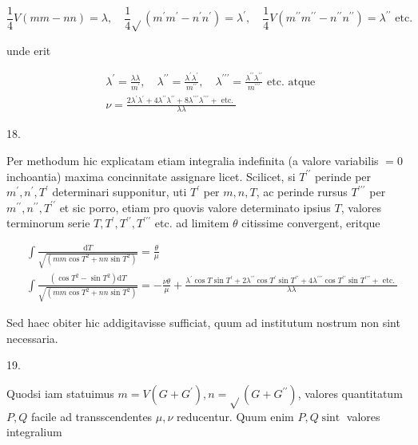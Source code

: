 \documentclass[10pt]{article}
\begin{document}
\[
\frac{1}{4} V(m m-n n)=\lambda, \quad \frac{1}{4} \sqrt{ }\left(m^{\prime} m^{\prime}-n^{\prime} n^{\prime}\right)=\lambda^{\prime}, \quad \frac{1}{4} V\left(m^{\prime \prime} m^{\prime \prime}-n^{\prime \prime} n^{\prime \prime}\right)=\lambda^{\prime \prime} \text { etc. }
\]

unde erit

\[
\begin{aligned}
& \lambda^{\prime}=\frac{\lambda \lambda}{m^{\prime}}, \quad \lambda^{\prime \prime}=\frac{\lambda^{\prime} \lambda^{\prime}}{m^{\prime \prime}}, \quad \lambda^{\prime \prime \prime}=\frac{\lambda^{\prime \prime} \lambda^{\prime \prime}}{m^{\prime \prime \prime}} \text { etc. atque } \\
& \nu=\frac{2 \lambda^{\prime} \lambda^{\prime}+4 \lambda^{\prime \prime} \lambda^{\prime \prime}+8 \lambda^{\prime \prime \prime} \lambda^{\prime \prime \prime}+\text { etc. }}{\lambda \lambda}
\end{aligned}
\]

18.

Per methodum hic explicatam etiam integralia indefinita (a valore variabilis \(=0\) inchoantia) maxima concinnitate assignare licet. Scilicet, si \(T^{\prime \prime}\) perinde per \(m^{\prime}, n^{\prime}, T^{\prime}\) determinari supponitur, uti \(T^{\prime}\) per \(m, n, T\), ac perinde rursus \(T^{\prime \prime \prime}\) per \(m^{\prime \prime}, n^{\prime \prime}, T^{\prime \prime}\) et sic porro, etiam pro quovis valore determinato ipsius \(T\), valores terminorum serie \(T, T^{\prime}, T^{\prime \prime}, T^{\prime \prime \prime}\) etc. ad limitem \(\theta\) citissime convergent, eritque

\[
\begin{aligned}
& \int \frac{\mathrm{d} T}{\sqrt{\left(m m \cos T^{2}+n n \sin T^{2}\right)}}=\frac{\theta}{\mu} \\
& \int \frac{\left(\cos T^{2}-\sin T^{2}\right) \mathrm{d} T}{\sqrt{\left(m m \cos T^{2}+n n \sin T^{2}\right)}}=-\frac{\nu \theta}{\mu}+\frac{\lambda^{\prime} \cos T \sin T^{\prime}+2 \lambda^{\prime \prime} \cos T^{\prime} \sin T^{\prime \prime}+4 \lambda^{\prime \prime \prime} \cos T^{\prime \prime} \sin T^{\prime \prime \prime}+\text { etc. }}{\lambda \lambda}
\end{aligned}
\]

Sed haec obiter hic addigitavisse sufficiat, quum ad institutum nostrum non sint necessaria.

19.

Quodsi iam statuimus \(m=V\left(G+G^{\prime}\right), n=\sqrt{ }\left(G+G^{\prime \prime}\right)\), valores quantitatum \(P, Q\) facile ad transscendentes \(\mu, \nu\) reducentur. Quum enim \(P, Q \operatorname{sint}\) valores integralium
\end{document}
